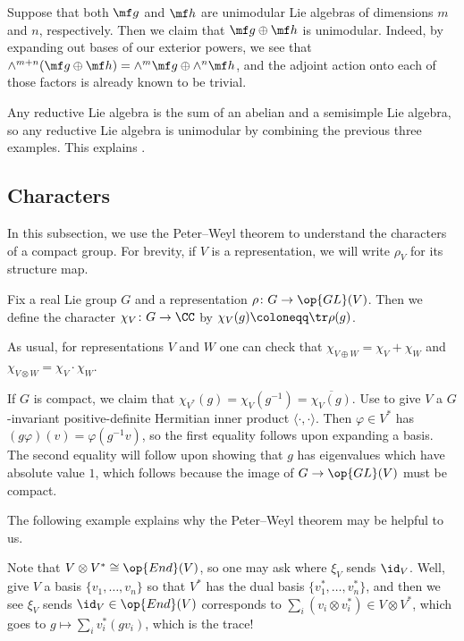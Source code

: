 \documentclass[notes.tex]{subfiles}
\begin{document}
\begin{example} \label{ex:unimodular-sums}
	Suppose that both $\mf g$ and $\mf h$ are unimodular Lie algebras of dimensions $m$ and $n$, respectively. Then we claim that $\mf g\oplus\mf h$ is unimodular. Indeed, by expanding out bases of our exterior powers, we see that $\land^{m+n}(\mf g\oplus\mf h)=\land^m\mf g\oplus\land^n\mf h$, and the adjoint action onto each of those factors is already known to be trivial.
\end{example}
\begin{example}
	Any reductive Lie algebra is the sum of an abelian and a semisimple Lie algebra, so any reductive Lie algebra is unimodular by combining the previous three examples. This explains .
\end{example}

\subsection{Characters}
In this subsection, we use the Peter--Weyl theorem to understand the characters of a compact group. For brevity, if $V$ is a representation, we will write $\rho_V$ for its structure map.
\begin{definition}[character]
	Fix a real Lie group $G$ and a representation $\rho\colon G\to\op{GL}(V)$. Then we define the character $\chi_V\colon G\to\CC$ by $\chi_V(g)\coloneqq\tr\rho(g)$.
\end{definition}
\begin{remark} \label{rem:char-sum-tensor}
	As usual, for representations $V$ and $W$ one can check that $\chi_{V\oplus W}=\chi_V+\chi_W$ and $\chi_{V\otimes W}=\chi_V\cdot\chi_W$.
\end{remark}
\begin{remark} \label{rem:char-dual}
	If $G$ is compact, we claim that $\chi_{V^*}(g)=\chi_V\left(g^{-1}\right)=\overline{\chi_V(g)}$. Use  to give $V$ a $G$-invariant positive-definite Hermitian inner product $\langle\cdot,\cdot\rangle$. Then $\varphi\in V^*$ has $(g\varphi)(v)=\varphi\left(g^{-1}v\right)$, so the first equality follows upon expanding a basis. The second equality will follow upon showing that $g$ has eigenvalues which have absolute value $1$, which follows because the image of $G\to\op{GL}(V)$ must be compact.
\end{remark}
The following example explains why the Peter--Weyl theorem may be helpful to us.
\begin{example} \label{ex:get-char}
	Note that $V\otimes V^*\cong\op{End}(V)$, so one may ask where $\xi_V$ sends $\id_V$. Well, give $V$ a basis $\{v_1,\ldots,v_n\}$ so that $V^*$ has the dual basis $\{v_1^*,\ldots,v_n^*\}$, and then we see $\xi_V$ sends $\id_V\in\op{End}(V)$ corresponds to $\sum_i(v_i\otimes v_i^*)\in V\otimes V^*$, which goes to $g\mapsto\sum_iv_i^*(gv_i)$, which is the trace!
\end{example}
\end{document}
